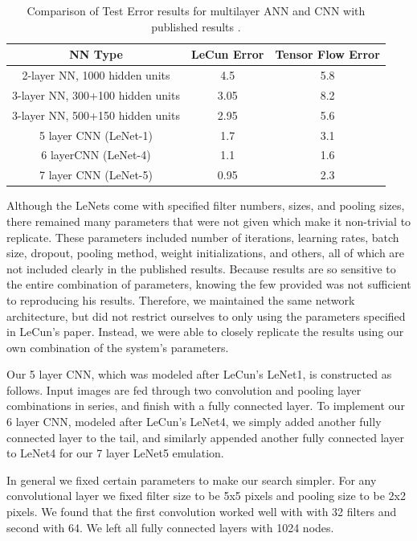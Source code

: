 \documentclass[12pt, twocolumn]{article}
\begin{document}
\begin{table}
\begin{center}
\begin{tabular} { |c | c | c | }
    \hline
    NN Type & LeCun Error  &   Tensor Flow Error \\ \hline
    2-layer NN, 1000 hidden units & 4.5  & 5.8\\ \hline
    3-layer NN, 300+100 hidden units & 3.05  & 8.2 \\ \hline
    3-layer NN, 500+150 hidden units & 2.95  & 5.6\\ \hline
    5 layer CNN  (LeNet-1) & 1.7  & 3.1\\ \hline 
    6 layerCNN (LeNet-4) & 1.1 & 1.6\\ \hline 
    7 layer CNN (LeNet-5) &  0.95  & 2.3\\ \hline
  \end{tabular}
\caption{Comparison of Test Error results for multilayer ANN and CNN with published results \cite{LeCun1998}.}
\label{table:MNISTLeCun}
\end{center}
\end{table}




Although the LeNets come with specified filter numbers, sizes, and pooling sizes, there remained many parameters that were not given which make it non-trivial to replicate. These parameters included number of iterations, learning rates, batch size, dropout, pooling method, weight initializations, and others, all of which are not included clearly in the published results. Because results are so sensitive to the entire combination of parameters, knowing the few provided was not sufficient to reproducing his results. Therefore, we maintained the same network architecture, but did not restrict ourselves to only using the parameters specified in LeCun's paper. Instead, we were able to closely replicate the results using our own combination of the system's parameters.

Our 5 layer CNN, which was modeled after LeCun's LeNet1, is constructed as follows. Input images are fed through two convolution and pooling layer combinations in series, and finish with a fully connected layer. To implement our 6 layer CNN, modeled after LeCun's LeNet4, we simply added another fully connected layer to the tail, and similarly appended another fully connected layer to LeNet4 for our 7 layer LeNet5 emulation. 

In general we fixed certain parameters to make our search simpler. For any convolutional layer we fixed filter size to be 5x5 pixels and pooling size to be 2x2 pixels. We found that the first convolution worked well with with 32 filters and second with 64.   We left all fully connected layers with 1024 nodes. 
\end{document}
